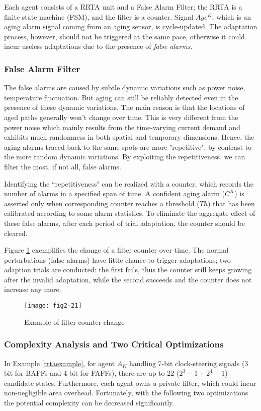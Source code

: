 Each agent consists of a RRTA unit and a False Alarm Filter; the RRTA is a finite state machine (FSM), and the filter is a counter. Signal $Age^K$, which is an aging alarm signal coming from an aging sensor, is cycle-updated. The adaptation process, however, should not be triggered at the same pace, otherwise it could incur useless adaptations due to the presence of \emph{false alarms}.

\subsubsection{False Alarm Filter}
The false alarms are caused by subtle dynamic variations \cite{degradation_05} such as power noise, temperature fluctuation. But aging can still be reliably detected even in the presence of these dynamic variations. The main reason is that the locations of aged paths generally won't change over time. This is very different from the power noise which mainly results from the time-varying current demand and exhibits much randomness in both spatial and temporary dimensions. Hence, the aging alarms traced back to the same spots are more "repetitive", by contrast to the more random dynamic variations. By exploiting the repetitiveness, we can filter the most, if not all, false alarms.

Identifying the ``repetitiveness" can be realized with a counter, which records the number of alarms in a specified span of time.  A confident aging alarm ($C^K$) is asserted only when corresponding counter reaches a threshold ($Th$) that has been calibrated according to some alarm statistics. To eliminate the aggregate effect of these false alarms, after each period of trial adaptation, the counter should be cleared.

Figure \ref{synadp} exemplifies the change of a filter counter over time. The normal perturbations (false alarms) have little chance to trigger adaptations; two adaption trials are conducted: the first fails, thus the counter still keeps growing after the invalid adaptation, while the second succeeds and the counter does not increase any more.

\begin{figure}[t]
\centering
\texttt{[image: fig2-21]}%
   \caption{Example of filter counter change}\label{synadp}
\end{figure}


\subsubsection{Complexity Analysis and Two Critical Optimizations}\label{section_complexity} In Example \ref{rrtaexample}, for agent $A_K$ handling 7-bit clock-steering signals (3 bit for BAFFs and 4 bit for FAFFs), there are up to 22 ($2^3-1+2^4-1$) candidate states. Furthermore, each agent owns a private filter, which could incur non-negligible area overhead. Fortunately, with the following two optimizations the potential complexity can be decreased significantly.

